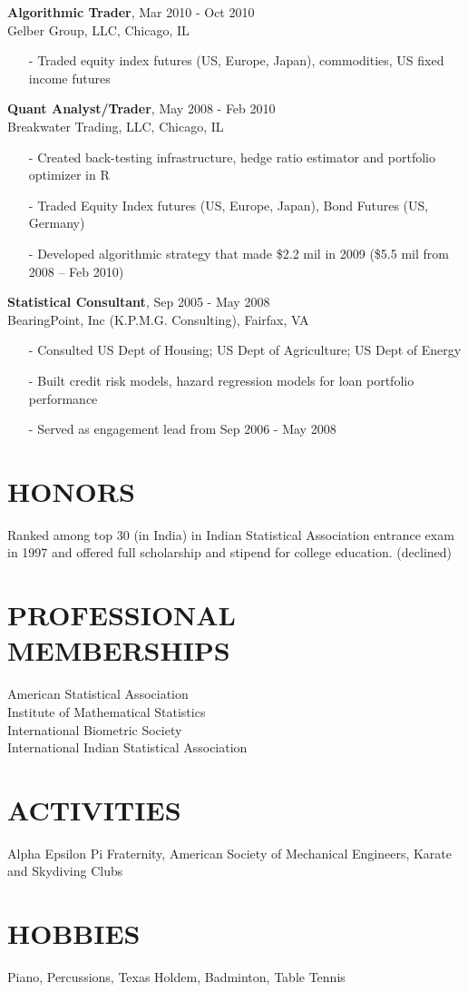 \documentclass[11pt]{res} %
\begin{document}
\begin{resume}
{\bf{Algorithmic Trader}}, \hfill Mar 2010 - Oct 2010 \\
Gelber Group, LLC, Chicago, IL
   \begin{itemize} \itemsep -2pt %
   \item[-] Traded equity index futures (US, Europe, Japan), commodities, US fixed income futures
   \end{itemize}

{\bf{Quant Analyst/Trader}}, \hfill May 2008 - Feb 2010 \\
Breakwater Trading, LLC, Chicago, IL
   \begin{itemize} \itemsep -2pt %
   \item[-] Created back-testing infrastructure, hedge ratio estimator and portfolio optimizer in R
   \item[-] Traded Equity Index futures (US, Europe, Japan), Bond Futures (US, Germany)
   \item[-] Developed algorithmic strategy that made \$2.2 mil in 2009 (\$5.5 mil from
2008 – Feb 2010)
   \end{itemize}

{\bf{Statistical Consultant}}, \hfill Sep 2005 - May 2008 \\
BearingPoint, Inc (K.P.M.G. Consulting), Fairfax, VA
   \begin{itemize} \itemsep -2pt %
   \item[-] Consulted US Dept of Housing; US Dept of Agriculture; US Dept of Energy
   \item[-] Built credit risk models, hazard regression models for loan portfolio performance
   \item[-] Served as engagement lead from Sep 2006 - May 2008
   \end{itemize}

\section{HONORS} 
Ranked among top 30 (in India) in Indian Statistical Association entrance exam in 1997 and offered full scholarship and stipend for college education. (declined)

\section{PROFESSIONAL MEMBERSHIPS}
American Statistical Association \\
Institute of Mathematical Statistics \\
International Biometric Society  \\
International Indian Statistical Association 
 
\section{ACTIVITIES} 
Alpha Epsilon  Pi  Fraternity,  American  Society  of  Mechanical 
Engineers, Karate and Skydiving Clubs 
 
\section{HOBBIES} 
Piano, Percussions, Texas Holdem, Badminton, Table Tennis
 
\end{resume}
\end{document}
